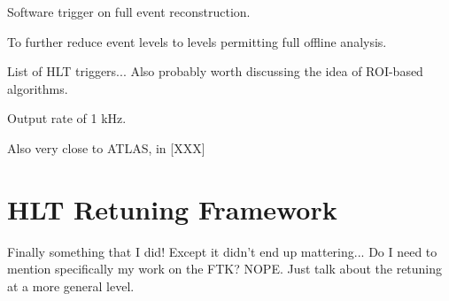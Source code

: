 Software trigger on full event reconstruction.

To further reduce event levels to levels permitting full offline analysis.

List of HLT triggers...
Also probably worth discussing the idea of ROI-based algorithms.

Output rate of 1 kHz.

Also very close to ATLAS, in [XXX]



\section{HLT Retuning Framework}
Finally something that I did!
Except it didn't end up mattering...
Do I need to mention specifically my work on the FTK? NOPE. Just talk about the retuning at a more general level.

